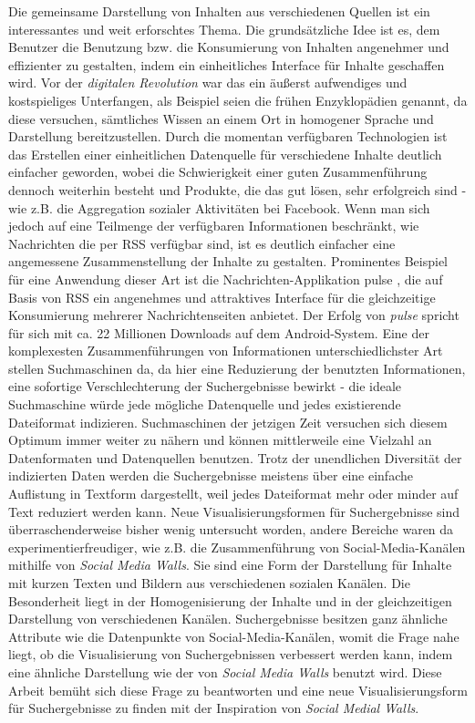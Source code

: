 \documentclass[12pt,twoside]{book}
\begin{document}
Die gemeinsame Darstellung von Inhalten aus verschiedenen Quellen ist ein interessantes und weit erforschtes Thema. Die grundsätzliche Idee ist es, dem Benutzer die Benutzung bzw. die Konsumierung von Inhalten angenehmer und effizienter zu gestalten, indem ein einheitliches Interface für Inhalte geschaffen wird. Vor der \textit{digitalen Revolution} war das ein äußerst aufwendiges und kostspieliges Unterfangen, als Beispiel seien die frühen Enzyklopädien genannt, da diese versuchen, sämtliches Wissen an einem Ort in homogener Sprache und Darstellung bereitzustellen. Durch die momentan verfügbaren Technologien ist das Erstellen einer einheitlichen Datenquelle für verschiedene Inhalte deutlich einfacher geworden, wobei die Schwierigkeit einer guten Zusammenführung dennoch weiterhin besteht und Produkte, die das gut lösen, sehr erfolgreich sind - wie z.B. die Aggregation sozialer Aktivitäten bei Facebook.
Wenn man sich jedoch auf eine Teilmenge der verfügbaren Informationen beschränkt, wie Nachrichten die per RSS verfügbar sind, ist es deutlich einfacher eine angemessene Zusammenstellung der Inhalte zu gestalten. Prominentes Beispiel für eine Anwendung dieser Art ist die Nachrichten-Applikation pulse \cite{pulse}, die auf Basis von RSS ein angenehmes und attraktives Interface für die gleichzeitige Konsumierung mehrerer Nachrichtenseiten anbietet. Der Erfolg von \textit{pulse} spricht für sich mit ca. 22 Millionen Downloads auf dem Android-System.
Eine der komplexesten Zusammenführungen von Informationen unterschiedlichster Art stellen Suchmaschinen da, da hier eine Reduzierung der benutzten Informationen, eine sofortige Verschlechterung der Suchergebnisse bewirkt - die ideale Suchmaschine würde jede mögliche Datenquelle und jedes existierende Dateiformat indizieren.
Suchmaschinen der jetzigen Zeit versuchen sich diesem Optimum immer weiter zu nähern und können mittlerweile eine Vielzahl an Datenformaten und Datenquellen benutzen.
Trotz der unendlichen Diversität der indizierten Daten werden die Suchergebnisse meistens über eine einfache Auflistung in Textform dargestellt, weil jedes Dateiformat mehr oder minder auf Text reduziert werden kann.
Neue Visualisierungsformen für Suchergebnisse sind überraschenderweise bisher wenig untersucht worden, andere Bereiche waren da experimentierfreudiger, wie z.B. die Zusammenführung von Social-Media-Kanälen mithilfe von \textit{Social Media Walls}.
Sie sind eine Form der Darstellung für Inhalte mit kurzen Texten und Bildern aus verschiedenen sozialen Kanälen. Die Besonderheit liegt in der Homogenisierung der Inhalte und in der gleichzeitigen Darstellung von verschiedenen Kanälen.
Suchergebnisse besitzen ganz ähnliche Attribute wie die Datenpunkte von Social-Media-Kanälen, womit die Frage nahe liegt, ob die Visualisierung von Suchergebnissen verbessert werden kann, indem eine ähnliche Darstellung wie der von \textit{Social Media Walls} benutzt wird.
Diese Arbeit bemüht sich diese Frage zu beantworten und eine neue Visualisierungsform für Suchergebnisse zu finden mit der Inspiration von \textit{Social Medial Walls}.
\end{document}
